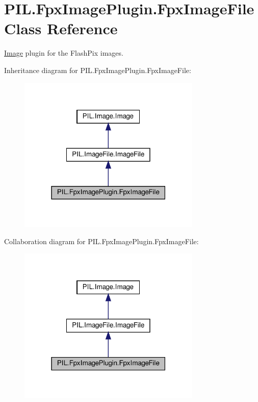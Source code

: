 \hypertarget{classPIL_1_1FpxImagePlugin_1_1FpxImageFile}{}\section{P\+I\+L.\+Fpx\+Image\+Plugin.\+Fpx\+Image\+File Class Reference}
\label{classPIL_1_1FpxImagePlugin_1_1FpxImageFile}


\hyperlink{namespacePIL_1_1Image}{Image} plugin for the Flash\+Pix images.  




Inheritance diagram for P\+I\+L.\+Fpx\+Image\+Plugin.\+Fpx\+Image\+File\+:
\nopagebreak
\begin{figure}[H]
\begin{center}
\leavevmode
\includegraphics[width=247pt]{classPIL_1_1FpxImagePlugin_1_1FpxImageFile__inherit__graph}
\end{center}
\end{figure}


Collaboration diagram for P\+I\+L.\+Fpx\+Image\+Plugin.\+Fpx\+Image\+File\+:
\nopagebreak
\begin{figure}[H]
\begin{center}
\leavevmode
\includegraphics[width=247pt]{classPIL_1_1FpxImagePlugin_1_1FpxImageFile__coll__graph}
\end{center}
\end{figure}
